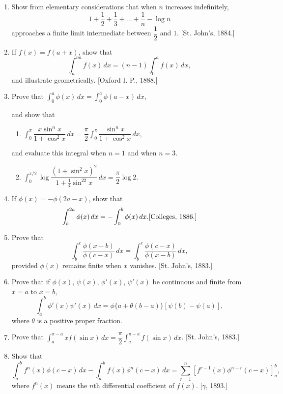 \documentclass[11pt, a4paper]{article}
\newcommand{\source}[1]{\hfill\textnormal{[#1]}}
\begin{document}
\begin{enumerate}[leftmargin=2em]
\item Show from elementary considerations that when $n$ increases indefinitely,
\[
1+\dfrac12+\dfrac13+\dots+\dfrac1n-\log n
\]
approaches a finite limit intermediate between $\dfrac12$ and $1$. \source{St. John's, 1884.}

\item If $f(x)=f(a+x)$, show that
\[
\int_a^{na} f(x)\,dx=(n-1)\int_0^a f(x)\,dx,
\]
and illustrate geometrically. \source{Oxford I. P., 1888.}

\item Prove that $\displaystyle\int_0^a \phi(x)\,dx=\int_0^a \phi(a-x)\,dx$,

and show that
\begin{enumerate}[label=(\arabic*)]
\item $\displaystyle\int_0^\pi \dfrac{x\sin^nx}{1+\cos^2x}\,dx=\dfrac{\pi}{2}\int_0^\pi \dfrac{\sin^nx}{1+\cos^2x}\,dx$,
\end{enumerate}
and evaluate this integral when $n=1$ and when $n=3$.
\begin{enumerate}[label=(\arabic*)]
\setcounter{enumii}{1}
\item $\displaystyle\int_0^{\pi/2} \log\dfrac{(1+\sin^2x)^2}{1+\frac14\sin^22x}\,dx=\dfrac{\pi}{2}\log2$.
\end{enumerate}

\item If $\phi(x)=-\phi(2a-x)$, show that
\[
\int_b^{2a}\phi(x)\,dx=-\int_0^b\phi(x)\,dx. \source{Colleges, 1886.}
\]

\item Prove that
\[
\int_b^c \dfrac{\phi(x-b)}{\phi(c-x)}\,dx=\int_b^c \dfrac{\phi(c-x)}{\phi(x-b)}\,dx,
\]
provided $\phi(x)$ remains finite when $x$ vanishes. \source{St. John's, 1883.}

\item Prove that if $\phi(x)$, $\psi(x)$, $\phi'(x)$, $\psi'(x)$ be continuous and finite from $x=a$ to $x=b$,
\[
\int_a^b \phi'(x)\psi'(x)\,dx=\phi\{a+\theta(b-a)\}[\psi(b)-\psi(a)],
\]
where $\theta$ is a positive proper fraction.

\item Prove that $\displaystyle\int_a^{\pi-a} xf(\sin x)\,dx=\dfrac{\pi}{2}\int_a^{\pi-a} f(\sin x)\,dx$. \source{St. John's, 1883.}

\item Show that
\[
\int_a^b f^n(x)\phi(c-x)\,dx-\int_a^b f(x)\phi^n(c-x)\,dx=\sum_{r=1}^{n}\left[f^{r-1}(x)\phi^{n-r}(c-x)\right]_a^b,
\]
where $f^n(x)$ means the $n$th differential coefficient of $f(x)$. \source{$\gamma$, 1893.}


\end{enumerate}
\end{document}
